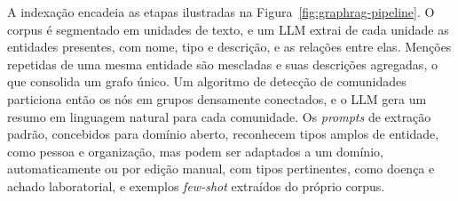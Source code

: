 A indexação encadeia as etapas ilustradas na Figura~\ref{fig:graphrag-pipeline}. O corpus é segmentado em unidades de texto, e um LLM extrai de cada unidade as entidades presentes, com nome, tipo e descrição, e as relações entre elas. Menções repetidas de uma mesma entidade são mescladas e suas descrições agregadas, o que consolida um grafo único. Um algoritmo de detecção de comunidades particiona então os nós em grupos densamente conectados, e o LLM gera um resumo em linguagem natural para cada comunidade. Os \textit{prompts} de extração padrão, concebidos para domínio aberto, reconhecem tipos amplos de entidade, como pessoa e organização, mas podem ser adaptados a um domínio, automaticamente ou por edição manual, com tipos pertinentes, como doença e achado laboratorial, e exemplos \textit{few-shot} extraídos do próprio corpus.

